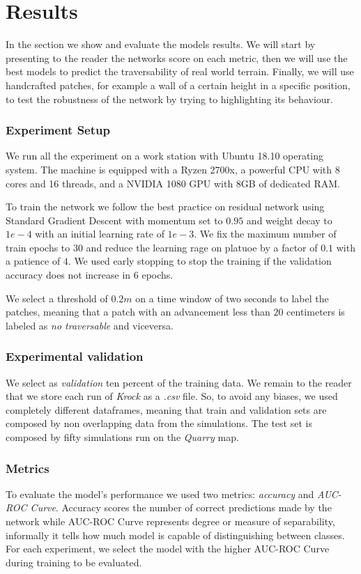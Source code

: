 \documentclass[../document.tex]{subfiles}
\begin{document}
\section{Results}
In the section we show and evaluate the models results. We will start by presenting to the reader the networks score on each metric, then we will use the best models to predict the traversability of real world terrain. Finally, we will use handcrafted patches, for example a wall of a certain height in a specific position, to test the robustness of the network by trying to highlighting its behaviour.
\subsubsection{Experiment Setup}
We run all the experiment on a work station with Ubuntu 18.10 operating system. The machine is equipped with a Ryzen 2700x, a powerful CPU with 8 cores and 16 threads, and a NVIDIA 1080 GPU with 8GB of dedicated RAM.

To train the network we follow the best practice on residual network \cite{he2015deep} using Standard Gradient Descent with momentum set to $0.95$ and weight decay to $1e-4$ with an initial learning rate of $1e-3$.
We fix the maximum number of train epochs to $30$ and reduce the learning rage on platuoe  by a factor of $0.1$ with a patience of $4$. We used early stopping to stop the training if the validation accuracy does not increase in $6$ epochs.

We select a threshold of $0.2m$ on a time window of two seconds to label the patches, meaning that a patch with an advancement less than $20$ centimeters is labeled as \emph{no traversable} and viceversa.

\subsubsection{Experimental validation}
We select as \emph{validation} ten percent of the training data. We remain to the reader that we store each run of \emph{Krock} as a \emph{.csv} file. So, to avoid any biases, we used completely different dataframes, meaning that train and validation sets are composed by non overlapping data from the simulations.
The test set is composed by fifty simulations run on the \emph{Quarry} map. 
\subsubsection{Metrics}
To evaluate the model's performance we used two metrics: \emph{accuracy} and \emph{AUC-ROC Curve}. Accuracy scores the number of correct predictions made by the network while AUC-ROC Curve represents degree or measure of separability, informally it tells how much model is capable of distinguishing between classes. For each experiment, we select the model with the higher AUC-ROC Curve during training to be evaluated.
\end{document}
